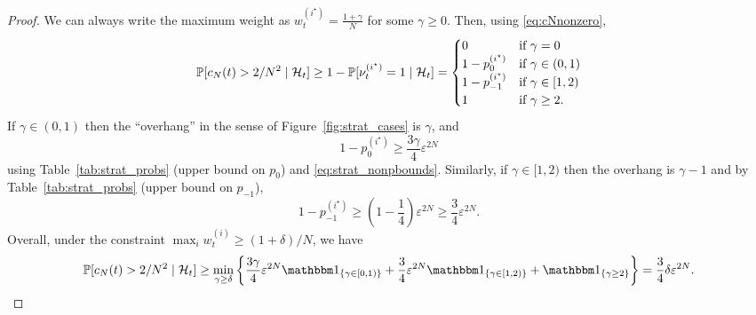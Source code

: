 \begin{proof}
We can always write the maximum weight as $w_t^{(i^\star)} = \frac{1+\gamma}{N}$ for some $\gamma \geq 0$. Then, using \eqref{eq:cNnonzero},
\begin{equation*}
\mathbb{P}[ c_N(t) > 2/N^2 \mid \mathcal{H}_t ]
\geq 1- \mathbb{P}[ \nu_t^{(i^\star)} =1 \mid \mathcal{H}_t ]
= \begin{cases}
    0 & \text{if } \gamma = 0 \\
    1 - p_0^{(i^\star)} & \text{if } \gamma \in (0,1) \\
    1 - p_{-1}^{(i^\star)} & \text{if } \gamma \in [1,2) \\
    1 & \text{if } \gamma \geq 2 .
\end{cases}
\end{equation*}
If $\gamma \in (0,1)$ then the ``overhang'' in the sense of Figure~\ref{fig:strat_cases} is $\gamma$, and
\begin{equation*}
1 - p_0^{(i^\star)}
\geq \frac{3\gamma }{4} \varepsilon^{2N}
\end{equation*}
using Table~\ref{tab:strat_probs} (upper bound on $p_0$) and \eqref{eq:strat_nonpbounds}.
Similarly, if $\gamma \in [1,2)$ then the overhang is $\gamma-1$ and by Table~\ref{tab:strat_probs} (upper bound on $p_{-1}$),
\begin{equation*}
1 - p_{-1}^{(i^\star)}
\geq \left( 1- \frac{1}{4} \right)
        \varepsilon^{2N} 
\geq \frac{3}{4} \varepsilon^{2N} .
\end{equation*}
Overall, under the constraint $\max_i w_t^{(i)} \geq (1+\delta)/N$, we have
\begin{equation*}
\Prob[ c_N(t) > 2/N^2 \mid \mathcal{H}_t ]
\geq \min_{\gamma \geq \delta} 
        \left\{ \frac{3\gamma }{4} \varepsilon^{2N} \I{\gamma \in [0,1)}
        + \frac{3 }{4} \varepsilon^{2N} \I{\gamma \in [1,2)}
        + \I{\gamma \geq 2} \right\}
= \frac{3}{4} \delta \varepsilon^{2N} .
\end{equation*}


\end{proof}
